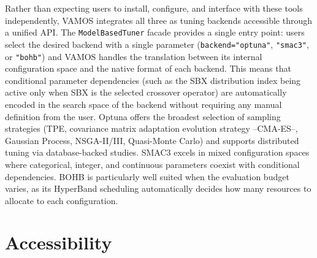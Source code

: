 \documentclass[final,5p,times,twocolumn]{elsarticle}
\newcommand{\VAMOS}{VAMOS}
\begin{document}
Rather than expecting users to install, configure, and interface with these tools independently, \VAMOS{} integrates all three as tuning backends accessible through a unified API. The \texttt{ModelBasedTuner} facade provides a single entry point: users select the desired backend with a single parameter (\texttt{backend="optuna"}, \texttt{"smac3"}, or \texttt{"bohb"}) and \VAMOS{} handles the translation between its internal configuration space and the native format of each backend. This means that conditional parameter dependencies (such as the SBX distribution index being active only when SBX is the selected crossover operator) are automatically encoded in the search space of the backend without requiring any manual definition from the user. Optuna offers the broadest selection of sampling strategies (TPE, covariance matrix adaptation evolution strategy --CMA-ES--, Gaussian Process, NSGA-II/III, Quasi-Monte Carlo) and supports distributed tuning via database-backed studies. SMAC3 excels in mixed configuration spaces where categorical, integer, and continuous parameters coexist with conditional dependencies. BOHB is particularly well suited when the evaluation budget varies, as its HyperBand scheduling automatically decides how many resources to allocate to each configuration.



\section{Accessibility}
\label{sec:accessibility}
\end{document}
